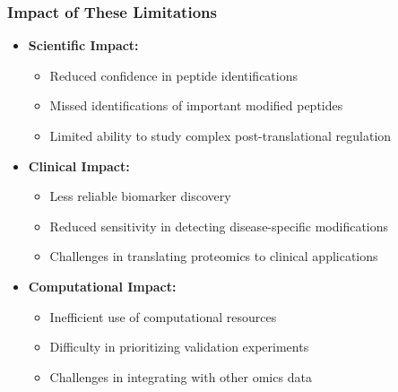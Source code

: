 \documentclass{beamer}
\begin{document}
\begin{frame}
  \frametitle{Impact of These Limitations}
  \begin{itemize}
    \item \textbf{Scientific Impact:}
    \begin{itemize}
      \item Reduced confidence in peptide identifications
      \item Missed identifications of important modified peptides
      \item Limited ability to study complex post-translational regulation
    \end{itemize}
    \item \textbf{Clinical Impact:}
    \begin{itemize}
      \item Less reliable biomarker discovery
      \item Reduced sensitivity in detecting disease-specific modifications
      \item Challenges in translating proteomics to clinical applications
    \end{itemize}
    \item \textbf{Computational Impact:}
    \begin{itemize}
      \item Inefficient use of computational resources
      \item Difficulty in prioritizing validation experiments
      \item Challenges in integrating with other omics data
    \end{itemize}
  \end{itemize}
\end{frame}
\end{document}
